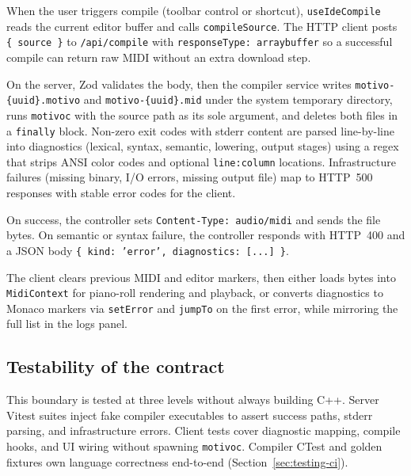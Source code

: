 When the user triggers compile (toolbar control or shortcut), \texttt{useIdeCompile} reads the current editor buffer
and calls \texttt{compileSource}.
The HTTP client posts \texttt{\{ source \}} to \texttt{/api/compile} with \texttt{responseType: arraybuffer} so a
successful compile can return raw MIDI without an extra download step.

On the server, Zod validates the body, then the compiler service writes \texttt{motivo-\{uuid\}.motivo} and
\texttt{motivo-\{uuid\}.mid} under the system temporary directory, runs \texttt{motivoc} with the source path
as its sole
argument, and deletes both files in a \texttt{finally} block.
Non-zero exit codes with stderr content are parsed line-by-line into diagnostics (lexical, syntax, semantic, lowering,
output stages) using a regex that strips ANSI color codes and optional \texttt{line:column} locations.
Infrastructure failures (missing binary, I/O errors, missing output file) map to HTTP~500 responses with stable error
codes for the client.

On success, the controller sets \texttt{Content-Type: audio/midi} and sends the file bytes.
On semantic or syntax failure, the controller responds with HTTP~400 and a JSON body \texttt{\{ kind: 'error',
diagnostics: [...] \}}.

The client clears previous MIDI and editor markers, then either loads bytes into \texttt{MidiContext} for piano-roll
rendering and playback, or converts diagnostics to Monaco markers via \texttt{setError} and \texttt{jumpTo} on the first
error, while mirroring the full list in the logs panel.

\subsection{Testability of the contract}\label{subsec:compile-contract-tests}

This boundary is tested at three levels without always building C++.
Server Vitest suites inject fake compiler executables to assert success paths, stderr parsing, and infrastructure
errors.
Client tests cover diagnostic mapping, compile hooks, and UI wiring without spawning \texttt{motivoc}.
Compiler CTest and golden fixtures own language correctness end-to-end (Section~\ref{sec:testing-ci}).
